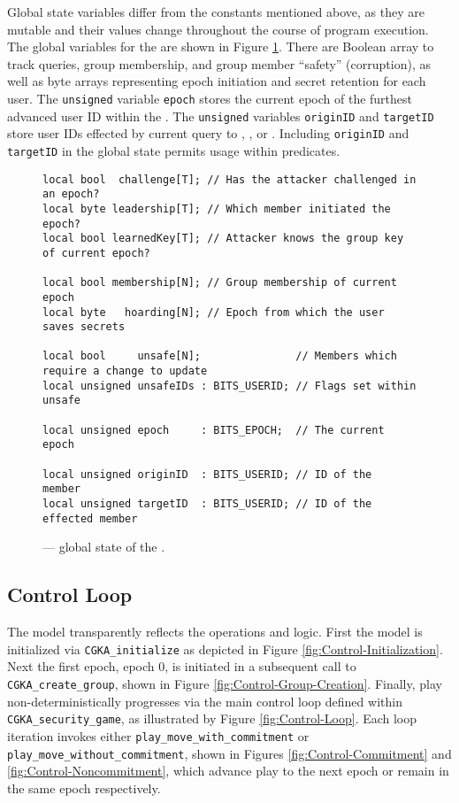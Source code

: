 Global state variables differ from the constants mentioned above, as they are mutable and their values change throughout the course of program execution.
The global variables for the  are shown in Figure \ref{fig:Global-State}.
There are Boolean array to track  queries, group membership, and group member ``safety'' (corruption), as well as byte arrays representing epoch initiation and secret retention for each user.
The \texttt{unsigned} variable \texttt{epoch} stores the current epoch of the furthest advanced user ID within the \CGKAsec.
The \texttt{unsigned} variables \texttt{originID} and \texttt{targetID} store user IDs effected by current query to , , or .
Including \texttt{originID} and \texttt{targetID} in the global state permits usage within  predicates.


\begin{figure}[h!]
  \centering
  \caption{\label{fig:Global-State}\CGKAmod{}{}{} --- global state of the \CGKAsec.}
\begin{verbatim}
local bool  challenge[T]; // Has the attacker challenged in an epoch?
local byte leadership[T]; // Which member initiated the epoch?
local bool learnedKey[T]; // Attacker knows the group key of current epoch?

local bool membership[N]; // Group membership of current epoch
local byte   hoarding[N]; // Epoch from which the user saves secrets

local bool     unsafe[N];               // Members which require a change to update
local unsigned unsafeIDs : BITS_USERID; // Flags set within unsafe

local unsigned epoch     : BITS_EPOCH;  // The current epoch

local unsigned originID  : BITS_USERID; // ID of the  member
local unsigned targetID  : BITS_USERID; // ID of the effected member
\end{verbatim}
\end{figure}


\hypertarget{subsec:control-loop}{%
\subsection{Control Loop}\label{subsec:control-loop}}

The  model transparently reflects the \CGKAsec operations and logic.
First the  model is initialized via \texttt{CGKA\_initialize} as depicted in Figure \ref{fig:Control-Initialization}.
Next the first epoch, epoch \(0\), is initiated in a subsequent call to \texttt{CGKA\_create\_group}, shown in Figure \ref{fig:Control-Group-Creation}.
Finally, play non-deterministically progresses via the main control loop defined within \texttt{CGKA\_security\_game}, as illustrated by Figure \ref{fig:Control-Loop}.
Each loop iteration invokes either \texttt{play\_move\_with\_commitment} or \texttt{play\_move\_without\_commitment}, shown in Figures \ref{fig:Control-Commitment} and \ref{fig:Control-Noncommitment}, which advance play to the next epoch or remain in the same epoch respectively.

